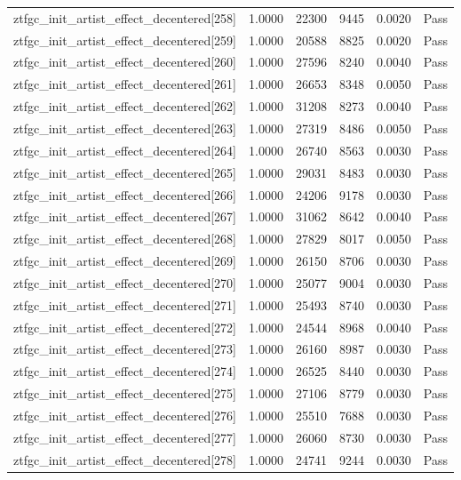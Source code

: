 \begin{table}[htbp]
\begin{tabular}{llrrll}
ztfgc\_init\_artist\_effect\_decentered[258] & 1.0000 & 22300 & 9445 & 0.0020 & Pass \\
ztfgc\_init\_artist\_effect\_decentered[259] & 1.0000 & 20588 & 8825 & 0.0020 & Pass \\
ztfgc\_init\_artist\_effect\_decentered[260] & 1.0000 & 27596 & 8240 & 0.0040 & Pass \\
ztfgc\_init\_artist\_effect\_decentered[261] & 1.0000 & 26653 & 8348 & 0.0050 & Pass \\
ztfgc\_init\_artist\_effect\_decentered[262] & 1.0000 & 31208 & 8273 & 0.0040 & Pass \\
ztfgc\_init\_artist\_effect\_decentered[263] & 1.0000 & 27319 & 8486 & 0.0050 & Pass \\
ztfgc\_init\_artist\_effect\_decentered[264] & 1.0000 & 26740 & 8563 & 0.0030 & Pass \\
ztfgc\_init\_artist\_effect\_decentered[265] & 1.0000 & 29031 & 8483 & 0.0030 & Pass \\
ztfgc\_init\_artist\_effect\_decentered[266] & 1.0000 & 24206 & 9178 & 0.0030 & Pass \\
ztfgc\_init\_artist\_effect\_decentered[267] & 1.0000 & 31062 & 8642 & 0.0040 & Pass \\
ztfgc\_init\_artist\_effect\_decentered[268] & 1.0000 & 27829 & 8017 & 0.0050 & Pass \\
ztfgc\_init\_artist\_effect\_decentered[269] & 1.0000 & 26150 & 8706 & 0.0030 & Pass \\
ztfgc\_init\_artist\_effect\_decentered[270] & 1.0000 & 25077 & 9004 & 0.0030 & Pass \\
ztfgc\_init\_artist\_effect\_decentered[271] & 1.0000 & 25493 & 8740 & 0.0030 & Pass \\
ztfgc\_init\_artist\_effect\_decentered[272] & 1.0000 & 24544 & 8968 & 0.0040 & Pass \\
ztfgc\_init\_artist\_effect\_decentered[273] & 1.0000 & 26160 & 8987 & 0.0030 & Pass \\
ztfgc\_init\_artist\_effect\_decentered[274] & 1.0000 & 26525 & 8440 & 0.0030 & Pass \\
ztfgc\_init\_artist\_effect\_decentered[275] & 1.0000 & 27106 & 8779 & 0.0030 & Pass \\
ztfgc\_init\_artist\_effect\_decentered[276] & 1.0000 & 25510 & 7688 & 0.0030 & Pass \\
ztfgc\_init\_artist\_effect\_decentered[277] & 1.0000 & 26060 & 8730 & 0.0030 & Pass \\
ztfgc\_init\_artist\_effect\_decentered[278] & 1.0000 & 24741 & 9244 & 0.0030 & Pass \\

\end{tabular}
\end{table}
